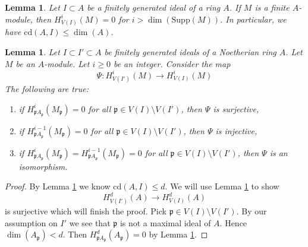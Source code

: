\documentclass[10pt,a4paper]{amsart}
\theoremstyle{plain}
\newtheorem{lemma}[subsection]{Lemma}
\theoremstyle{definition}
\theoremstyle{remark}
\numberwithin{equation}{subsection}
\begin{document}
\begin{lemma}
\label{lemma-cd-dimension}
Let $I \subset A$ be a finitely generated ideal of a ring $A$.
If $M$ is a finite $A$-module, then
$H^i_{V(I)}(M) = 0$ for $i > \dim(\text{Supp}(M))$.
In particular, we have $\text{cd}(A, I) \leq \dim(A)$.
\end{lemma}

\begin{lemma}
\label{lemma-isomorphism}
Let $I \subset I' \subset A$ be finitely generated ideals of a
Noetherian ring $A$. Let $M$ be an $A$-module. Let $i \geq 0$ be an integer.
Consider the map
$$
\Psi : H^i_{V(I')}(M) \to H^i_{V(I)}(M)
$$
The following are true:
\begin{enumerate}
\item if $H^i_{\mathfrak pA_\mathfrak p}(M_\mathfrak p) = 0$
for all $\mathfrak p \in V(I) \setminus V(I')$, then
$\Psi$ is surjective,
\item if $H^{i - 1}_{\mathfrak pA_\mathfrak p}(M_\mathfrak p) = 0$
for all $\mathfrak p \in V(I) \setminus V(I')$, then
$\Psi$ is injective,
\item if $H^i_{\mathfrak pA_\mathfrak p}(M_\mathfrak p) =
H^{i - 1}_{\mathfrak pA_\mathfrak p}(M_\mathfrak p) = 0$
for all $\mathfrak p \in V(I) \setminus V(I')$, then
$\Psi$ is an isomorphism.
\end{enumerate}
\end{lemma}

\begin{proof}
By Lemma \ref{lemma-cd-dimension} we know $\text{cd}(A, I) \leq d$.
We will use Lemma \ref{lemma-isomorphism} to show
$$
H^d_{V(I')}(A) \to H^d_{V(I)}(A)
$$
is surjective which will finish the proof. Pick
$\mathfrak p \in V(I) \setminus V(I')$. By our assumption
on $I'$ we see that $\mathfrak p$ is not a maximal ideal of $A$.
Hence $\dim(A_\mathfrak p) < d$. Then
$H^d_{\mathfrak pA_\mathfrak p}(A_\mathfrak p) = 0$
by Lemma \ref{lemma-cd-dimension}.
\end{proof}
\end{document}
